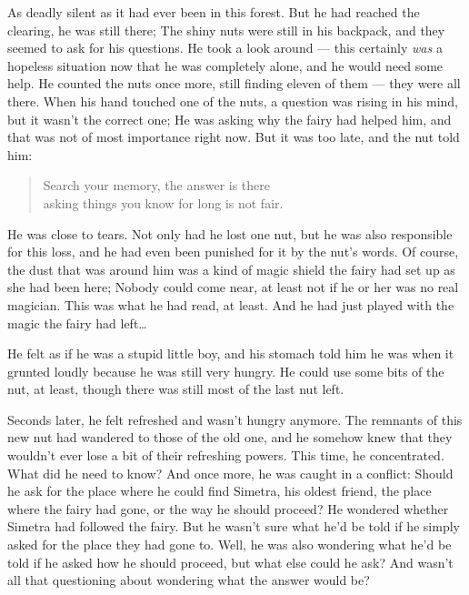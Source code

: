 As deadly silent as it had ever been in this forest. But he had reached the clearing, he was still there; The shiny nuts were still in his backpack, and they seemed to ask for his questions. He took a look around --- this certainly \emph{was} a hopeless situation now that he was completely alone, and he would need some help. He counted the nuts once more, still finding eleven of them --- they were all there. When his hand touched one of the nuts, a question was rising in his mind, but it wasn't the correct one; He was asking why the fairy had helped him, and that was not of most importance right now. But it was too late, and the nut told him: 
\begin{quote}
Search your memory, the answer is there\\
asking things you know for long is not fair. 
\end{quote}
He was close to tears. Not only had he lost one nut, but he was also responsible for this loss, and he had even been punished for it by the nut's words. Of course, the dust that was around him was a kind of magic shield the fairy had set up as she had been here; Nobody could come near, at least not if he or her was no real magician. This was what he had read, at least. And he had just played with the magic the fairy had left\dots{}

He felt as if he was a stupid little boy, and his stomach told him he was when it grunted loudly because he was still very hungry. He could use some bits of the nut, at least, though there was still most of the last nut left.

Seconds later, he felt refreshed and wasn't hungry anymore. The remnants of this new nut had wandered to those of the old one, and he somehow knew that they wouldn't ever lose a bit of their refreshing powers. 
This time, he concentrated. What did he need to know? And once more, he was caught in a conflict: Should he ask for the place where he could find Simetra, his oldest friend, the place where the fairy had gone, or the way he should proceed? He wondered whether Simetra had followed the fairy. But he wasn't sure what he'd be told if he simply asked for the place they had gone to. Well, he was also wondering what he'd be told if he asked how he should proceed, but what else could he ask? And wasn't all that questioning about wondering what the answer would be?

